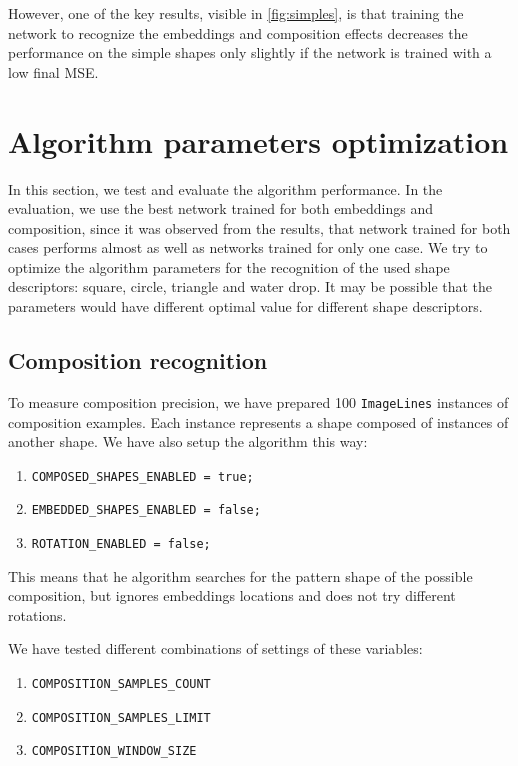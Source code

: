 However, one of the key results, visible in \cref{fig:simples}, is that training the network to recognize the embeddings and composition effects decreases the performance on the simple shapes only slightly if the network is trained with a low final MSE.

\section{Algorithm parameters optimization}
In this section, we test and evaluate the algorithm performance. In the evaluation, we use the best network trained for both embeddings and composition, since it was observed from the results, that network trained for both cases performs almost as well as networks trained for only one case. We try to optimize the algorithm parameters for the recognition of the used shape descriptors: square, circle, triangle and water drop. It may be possible that the parameters would have different optimal value for different shape descriptors. 

\subsection{Composition recognition}
To measure composition precision, we have prepared 100 \texttt{ImageLines} instances of composition examples. Each instance represents a shape composed of instances of another shape. We have also setup the algorithm this way:
\begin{enumerate}
\item \texttt{COMPOSED\_SHAPES\_ENABLED = true;}
\item \texttt{EMBEDDED\_SHAPES\_ENABLED = false;}
\item \texttt{ROTATION\_ENABLED = false;}
\end{enumerate}
This means that he algorithm searches for the pattern shape of the possible composition, but ignores embeddings locations and does not try different rotations.

We have tested different combinations of settings of these variables:
\begin{enumerate}
\item \texttt{COMPOSITION\_SAMPLES\_COUNT}
\item \texttt{COMPOSITION\_SAMPLES\_LIMIT}
\item \texttt{COMPOSITION\_WINDOW\_SIZE} 
\end{enumerate}

